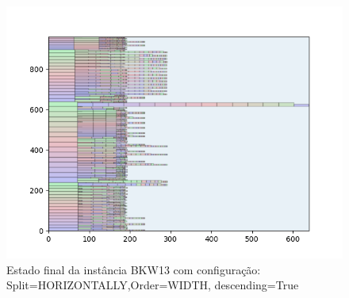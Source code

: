 \begin{figure}[H]
    \centering
    \caption[]{Estado final da instância BKW13 com configuração: Split=HORIZONTALLY,Order=WIDTH, descending=True}
    \label{fig:bkw13-horizontally-width-true}
    \includegraphics[scale=0.5]{output/figures/bkw/bkw13/horizontally/width/true/0000}
\end{figure}